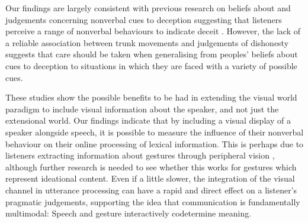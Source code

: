 \documentclass[a4paper,man,natbib]{apa6}
\begin{document}
Our findings are largely consistent with previous research on beliefs about and judgements concerning nonverbal cues to deception suggesting that listeners perceive a range of nonverbal behaviours to indicate deceit \citep[e.g.][]{Zuckerman1981, Akehurst1996, Vrij2000}.
However, the lack of a reliable association between trunk movements and judgements of dishonesty suggests that care should be taken when generalising from peoples' beliefs about cues to deception \citep[e.g.][]{Vrij1996a} to situations in which they are faced with a variety of possible cues.

These studies show the possible benefits to be had in extending the visual world paradigm to include visual information about the speaker, and not just the extensional world.
Our findings indicate that by including a visual display of a speaker alongside speech, it is possible to measure the influence of their nonverbal behaviour on their online processing of lexical information.
This is perhaps due to listeners extracting information about gestures through peripheral vision \citep[See e.g.][]{Gullberg2006}, although further research is needed to see whether this works for gestures which represent ideational content.
Even if a little slower, the integration of the visual channel in utterance processing can have a rapid and direct effect on a listener's pragmatic judgements, supporting the idea that communication is fundamentally multimodal: 
Speech and gesture interactively codetermine meaning.



\end{document}

